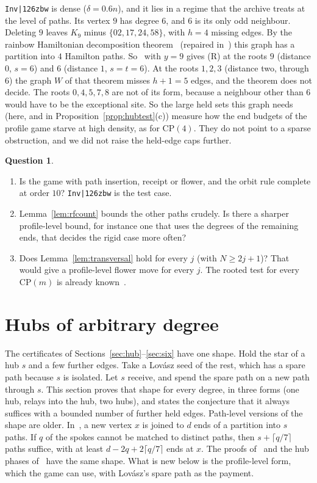 \documentclass[11pt]{amsart}
\theoremstyle{definition}
\newtheorem{question}[theorem]{Question}
\begin{document}
\texttt{Inv|\char126zbw} is dense ($\delta=0.6n$), and it lies in a regime that the archive
treats at the level of paths. Its vertex $9$ has degree $6$, and $6$ is its only odd neighbour.
Deleting $9$ leaves $K_9$ minus $\{02,17,24,58\}$, with $h=4$ missing edges. By the rainbow
Hamiltonian decomposition theorem~\cite{JM} (repaired in~\cite{JMR}) this graph has a partition into
$4$ Hamilton paths. So~\cite[Thm.~12.29]{SP} with $y=9$ gives (R) at the roots $9$ (distance $0$,
$s=6$) and $6$ (distance $1$, $s=t=6$). At the roots $1,2,3$ (distance two, through $6$) the graph
$W$ of that theorem misses $h+1=5$ edges, and the theorem does not decide. The roots $0,4,5,7,8$ are
not of its form, because a neighbour other than $6$ would have to be the exceptional site. So the
large held sets this graph needs (here, and in Proposition~\ref{prop:hubtest}(c)) measure how the
end budgets of the profile game starve at high density, as for $\mathrm{CP}(4)$. They do not point
to a sparse obstruction, and we did not raise the held-edge caps further.

\begin{question}\label{q:count}
\begin{enumerate}[label=(\alph*)]
\item Is the game with path insertion, receipt or flower, and the orbit rule complete at order
$10$? \texttt{Inv|\char126zbw} is the test case.
\item Lemma~\ref{lem:rfcount} bounds the other paths crudely. Is there a sharper profile-level
bound, for instance one that uses the degrees of the remaining ends, that decides the rigid case
more often?
\item Does Lemma~\ref{lem:transversal} hold for every $j$ (with $N\ge2j+1$)? That would give a
profile-level flower move for every $j$. The rooted test for every $\mathrm{CP}(m)$ is already
known~\cite[Thm.~10.21]{SP}.
\end{enumerate}
\end{question}

\section{Hubs of arbitrary degree}\label{sec:general}

The certificates of Sections~\ref{sec:hub}--\ref{sec:six} have one shape. Hold the star of a hub
$s$ and a few further edges. Take a Lov\'asz seed of the rest, which has a spare path because $s$
is isolated. Let $s$ receive, and spend the spare path on a new path through $s$. This section
proves that shape for every degree, in three forms (one hub, relays into the hub, two hubs), and
states the conjecture that it always suffices with a bounded number of further held edges.
Path-level versions of the shape are older. In~\cite[Cor.~39]{MR}, a new vertex $x$ is joined to
$d$ ends of a partition into $s$ paths. If $q$ of the spokes cannot be matched to distinct paths,
then $s+\lceil q/7\rceil$ paths suffice, with at least $d-2q+2\lceil q/7\rceil$ ends at $x$. The proofs
of~\cite[Thms.~12.29, 13.9]{SP} and the hub phases of~\cite{D6} have the same shape. What is new
below is the profile-level form, which the game can use, with Lov\'asz's spare path as the
payment.
\end{document}
